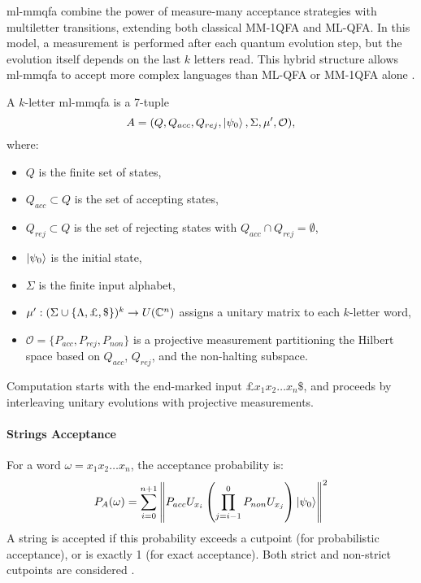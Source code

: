 \gls{ml-mmqfa} combine the power of measure-many acceptance strategies with multiletter transitions, extending both classical MM-1QFA and ML-QFA. In this model, a measurement is performed after each quantum evolution step, but the evolution itself depends on the last $k$ letters read. This hybrid structure allows \gls{ml-mmqfa} to accept more complex languages than ML-QFA or MM-1QFA alone \cite{lin2012equivalence}.

\begin{definition}
A $k$-letter \gls{ml-mmqfa} is a 7-tuple \[A = (Q, Q_{acc}, Q_{rej}, \ket{\psi_0}, \Sigma, \mu', \mathcal{O}),\] where:
\begin{itemize}
    \item $Q$ is the finite set of states,
    \item $Q_{acc} \subset Q$ is the set of accepting states,
    \item $Q_{rej} \subset Q$ is the set of rejecting states with $Q_{acc} \cap Q_{rej} = \emptyset$,
    \item $\ket{\psi_0}$ is the initial state,
    \item $\Sigma$ is the finite input alphabet,
    \item $\mu': (\Sigma \cup \{\Lambda, \text{\textsterling}, \$\})^k \to U(\mathbb{C}^n)$ assigns a unitary matrix to each $k$-letter word,
    \item $\mathcal{O} = \{P_{acc}, P_{rej}, P_{non}\}$ is a projective measurement partitioning the Hilbert space based on $Q_{acc}$, $Q_{rej}$, and the non-halting subspace.
\end{itemize}
\end{definition}

Computation starts with the end-marked input £$x_1x_2 \dots x_n\$$, and proceeds by interleaving unitary evolutions with projective measurements.

\paragraph{Strings Acceptance}
For a word $\omega = x_1 x_2 \dots x_n$, the acceptance probability is:
\[
P_A(\omega) = \sum_{i=0}^{n+1} \left\| P_{acc} U_{x_i} \left( \prod_{j=i-1}^{0} P_{non} U_{x_j} \right) \ket{\psi_0} \right\|^2
\]
A string is accepted if this probability exceeds a cutpoint (for probabilistic acceptance), or is exactly 1 (for exact acceptance). Both strict and non-strict cutpoints are considered \cite{lin2012equivalence}.

